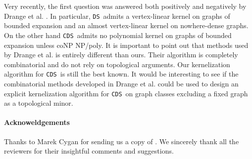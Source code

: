 \documentclass[11pt]{article}
\newcommand{\tDS}{{\texttt{\sc DS}}}
\newcommand{\tCDS}{{\texttt{\sc CDS}}}
\begin{document}
Very recently,  the first question was answered both positively and negatively by Drange et al. \cite{Drange2015}.  In particular, \tDS \ admits a vertex-linear kernel on graphs of bounded expansion and an almost vertex-linear kernel on nowhere-dense graphs. On the other hand  
  \tCDS  \ admits no polynomial kernel on graphs of bounded expansion unless \textsf{coNP} 
    \textsf{NP/poly}.  It is important to point out that methods used by Drange et al. \cite{Drange2015} is entirely different than ours. Their algorithm is completely combinatorial and do not rely on topological arguments. Our kernelization algorithm for \tCDS\ is still the best known. It would be interesting to see if the combinatorial methods developed in 
  Drange et al. \cite{Drange2015} could be used to design an explicit kernelization algorithm for \tCDS\ on graph classes excluding a fixed graph  as a topological minor. 
 


\paragraph{Acknoweldgements}
Thanks to Marek Cygan for sending us a copy of \cite{CyganGH12}. We sincerely thank all the reviewers for their insightful comments and suggestions. 
\end{document}
